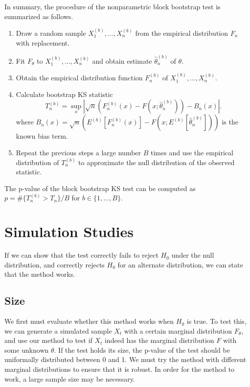 \documentclass[12pt, titlepage, letterpaper]{article}
\begin{document}
{In summary, the procedure of the nonparametric block bootstrap test is 
summarized as follows.
\begin{enumerate}
\item
  Draw a random sample $X^{(b)}_1,...,X^{(b)}_n$ from the empirical distribution 
  $F_n$
  with replacement.
\item
  Fit $F_\theta$ to $X^{(b)}_1,...,X^{(b)}_n$ and obtain estimate 
	$\hat\theta^{(b)}_n$ of $\theta$.
\item
  Obtain the empirical distribution function $F^{(b)}_n$ of
  $X^{(b)}_1,...,X^{(b)}_n$. 
\item
  Calculate bootstrap KS statistic
  \[
    T^{(b)}_n = \sup_x | \sqrt{n}\left(F^{(b)}_n(x) 
    - F(x; \hat\theta^{(b)}_n)\right) - B_n(x) |.
  \]
  where 
  $B_{n}(x) = \sqrt{n}(E^{(b)}[F^{(b)}_n(x)] - 
  F(x; E^{(b)}[\hat\theta^{(b)}_n]))$ is the known
  bias term.
\item
  Repeat the previous steps a large number $B$ times and use the empirical
  distribution of $T^{(b)}_n$ to approximate the null distribution of the observed
  statistic. 
\end{enumerate}


The p-value of the block bootstrap KS test can be computed
as $p = \#\{T^{(b)}_n > T_n\} / B$ for 
$b \in \{1, \ldots, B\}$.

\section{Simulation Studies}
\label{sec:simu}

If we can show that the test correctly fails to reject $H_0$ under the null
distribution, and correctly rejects $H_0$ for an alternate distribution, we can
state that the method works.


\subsection{Size}
We first must evaluate whether this method works when $H_0$ is true. To
test this, we can
generate a simulated sample $X_t$ with a certain marginal distribution 
$F_\theta$,
and use our method to test if $X_t$ indeed has the marginal distribution $F$ 
with some unknown $\theta$. If the test holds its size, the 
p-value
of the test should be uniformally distributed between 0 and 1. We must try the
method with different marginal distributions to ensure that it is robust.
In order for the method to work, a large sample size may be necessary. 


}
\end{document}
